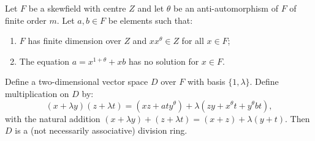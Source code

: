Let $F$ be a skewfield with centre $Z$ and let $\theta$ be an anti-automorphism of $F$ of finite order $m$. Let $a, b \in F$ be elements such that:
\begin{enumerate}
\item $F$ has finite dimension over $Z$ and $x x^\theta \in Z$ for all $x \in F$;
\item The equation $a = x^{1+\theta} + xb$ has no solution for $x \in F$.
\end{enumerate}
Define a two-dimensional vector space $D$ over $F$ with basis $\{1, \lambda\}$. Define multiplication on $D$ by:
$$
(x + \lambda y)(z + \lambda t) = (xz + a t y^\theta) + \lambda(z y + x^\theta t + y^\theta b t),
$$
with the natural addition $(x + \lambda y) + (z + \lambda t) = (x+z) + \lambda(y+t)$. Then $D$ is a (not necessarily associative) division ring.